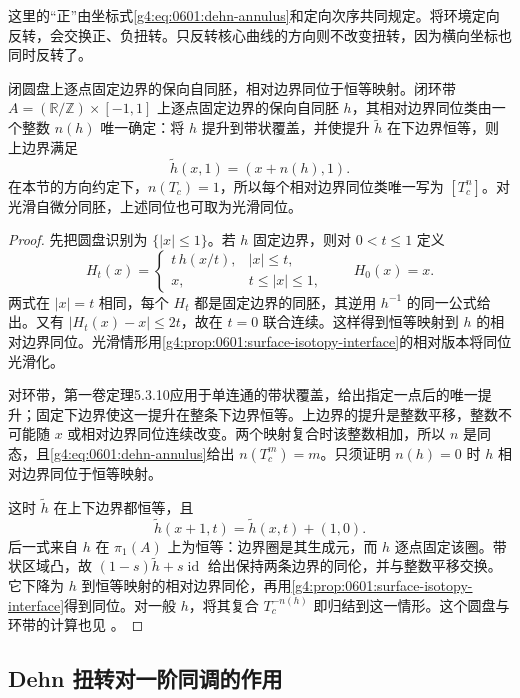 这里的“正”由坐标式\eqref{g4:eq:0601:dehn-annulus}和定向次序共同规定。将环境定向反转，会交换正、负扭转。只反转核心曲线的方向则不改变扭转，因为横向坐标也同时反转了。

\begin{lemma}\label{g4:lem:0601:relative-disk-annulus}
	闭圆盘上逐点固定边界的保向自同胚，相对边界同位于恒等映射。闭环带 \(A=(\mathbb R/\mathbb Z)\times[-1,1]\) 上逐点固定边界的保向自同胚 \(h\)，其相对边界同位类由一个整数 \(n(h)\) 唯一确定：将 \(h\) 提升到带状覆盖，并使提升 \(\widetilde h\) 在下边界恒等，则上边界满足
	\[
		\widetilde h(x,1)=(x+n(h),1).
	\]
	在本节的方向约定下，\(n(T_c)=1\)，所以每个相对边界同位类唯一写为 \([T_c^n]\)。对光滑自微分同胚，上述同位也可取为光滑同位。
\end{lemma}
\begin{proof}
	先把圆盘识别为 \(\{|x|\le1\}\)。若 \(h\) 固定边界，则对 \(0<t\le1\) 定义
	\[
		H_t(x)=
		\begin{cases}
			t\,h(x/t),&|x|\le t,\\
			x,&t\le|x|\le1,
		\end{cases}
		\qquad H_0(x)=x.
	\]
	两式在 \(|x|=t\) 相同，每个 \(H_t\) 都是固定边界的同胚，其逆用 \(h^{-1}\) 的同一公式给出。又有 \(|H_t(x)-x|\le2t\)，故在 \(t=0\) 联合连续。这样得到恒等映射到 \(h\) 的相对边界同位。光滑情形用\cref{g4:prop:0601:surface-isotopy-interface}的相对版本将同位光滑化。

	对环带，第一卷定理5.3.10应用于单连通的带状覆盖，给出指定一点后的唯一提升；固定下边界使这一提升在整条下边界恒等。上边界的提升是整数平移，整数不可能随 \(x\) 或相对边界同位连续改变。两个映射复合时该整数相加，所以 \(n\) 是同态，且\eqref{g4:eq:0601:dehn-annulus}给出 \(n(T_c^m)=m\)。只须证明 \(n(h)=0\) 时 \(h\) 相对边界同位于恒等映射。

	这时 \(\widetilde h\) 在上下边界都恒等，且
	\[
		\widetilde h(x+1,t)=\widetilde h(x,t)+(1,0).
	\]
	后一式来自 \(h\) 在 \(\pi_1(A)\) 上为恒等：边界圈是其生成元，而 \(h\) 逐点固定该圈。带状区域凸，故 \((1-s)\widetilde h+s\operatorname{id}\) 给出保持两条边界的同伦，并与整数平移交换。它下降为 \(h\) 到恒等映射的相对边界同伦，再用\cref{g4:prop:0601:surface-isotopy-interface}得到同位。对一般 \(h\)，将其复合 \(T_c^{-n(h)}\) 即归结到这一情形。这个圆盘与环带的计算也见 \cite[第47--48页，引理2.1；第51--52页，命题2.4]{FarbMargalit2012Primer}。
\end{proof}

\subsection{Dehn 扭转对一阶同调的作用}
\label{g4:subsec:0601:05}


